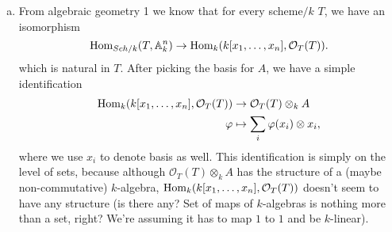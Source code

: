 \newcommand{\sheet}{2}




\maketitle{}

\begin{exercise}{1}
    \begin{enumerate}[a)]
        \item{



                From algebraic geometry 1 we know that for every scheme$/k$ $T$,
                we have an isomorphism
                \begin{equation*}
                    \operatorname{Hom}_{Sch/k}(T, \mathbb{A}^n_k) \to \operatorname{Hom}_k(k[x_1, \dots, x_n],
                    \mathcal{O}_T(T)).
                \end{equation*}
                which is natural in $T$.
                After picking the basis for $A$, we have a simple identification
                \begin{equation*}
                    \begin{split}
                        \operatorname{Hom}_k(k[x_1, \dots, x_n], \mathcal{O}_T(T)) &\to \mathcal{O}_T(T) \otimes_k A \\
                        \varphi &\mapsto \sum_i \varphi(x_i) \otimes x_i,
                    \end{split}
                \end{equation*}
                where we use $x_i$ to denote basis as well.
                This identification is simply on the level of sets, because
                although $\mathcal{O}_T(T) \otimes_k A$ has the structure of a
                (maybe non-commutative) $k$-algebra, $\operatorname{Hom}_k(k[x_1, \dots, x_n], \mathcal{O}_T(T))$
                doesn't seem to have any structure (is there any? Set of maps of
                $k$-algebras is nothing more than a set, right? We're assuming it
                has to map $1$ to $1$ and be $k$-linear).

}
\end{enumerate}
\end{exercise}
